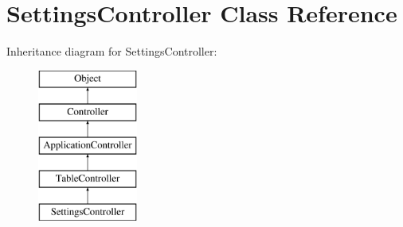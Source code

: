\hypertarget{class_settings_controller}{
\section{SettingsController Class Reference}
\label{class_settings_controller}
}
Inheritance diagram for SettingsController:\begin{figure}[H]
\begin{center}
\leavevmode
\includegraphics[height=5.000000cm]{class_settings_controller}
\end{center}
\end{figure}
